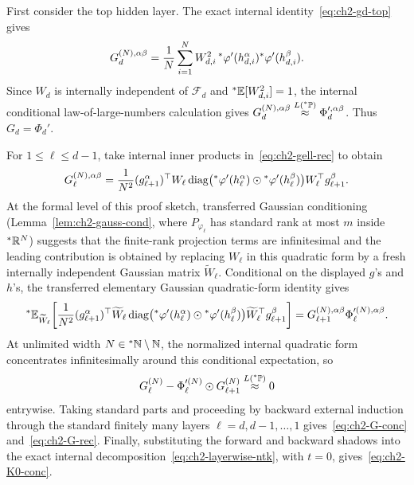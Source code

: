 \begin{proofsketch}
First consider the top hidden layer. The exact internal identity~\eqref{eq:ch2-gd-top} gives
\begin{equation}\label{eq:ch2-Gd-sum}
G_d^{(N),\alpha\beta} = \frac{1}{N} \sum_{i=1}^{N} W_{d,i}^2 \, {}^*\varphi'(h_{d,i}^\alpha){}^*\varphi'(h_{d,i}^\beta).
\end{equation}
Since $W_d$ is internally independent of $\mathcal{F}_d$ and ${}^*\mathbb{E}[W_{d,i}^2] = 1$, the internal conditional law-of-large-numbers calculation gives $G_d^{(N),\alpha\beta} \stackrel{L({}^*\mathbb{P})}{\approx} \Phi_d^{\prime,\alpha\beta}$. Thus $G_d = \Phi_d'$.

For $1 \le \ell \le d-1$, take internal inner products in~\eqref{eq:ch2-gell-rec} to obtain
\begin{equation}\label{eq:ch2-Gell-quad}
G_\ell^{(N),\alpha\beta} = \frac{1}{N^2} (g_{\ell+1}^\alpha)^\top W_\ell \operatorname{diag}\bigl({}^*\varphi'(h_\ell^\alpha) \odot {}^*\varphi'(h_\ell^\beta)\bigr) W_\ell^\top g_{\ell+1}^\beta.
\end{equation}
At the formal level of this proof sketch, transferred Gaussian conditioning (Lemma~\ref{lem:ch2-gauss-cond}, where $P_{\varphi_\ell}$ has standard rank at most $m$ inside ${}^*\mathbb{R}^N$) suggests that the finite-rank projection terms are infinitesimal and the leading contribution is obtained by replacing $W_\ell$ in this quadratic form by a fresh internally independent Gaussian matrix $\widetilde{W}_\ell$. Conditional on the displayed $g$'s and $h$'s, the transferred elementary Gaussian quadratic-form identity gives
\begin{equation}\label{eq:ch2-Gell-fresh-exp}
{}^*\mathbb{E}_{\widetilde{W}_\ell}\!\left[ \frac{1}{N^2} (g_{\ell+1}^\alpha)^\top \widetilde{W}_\ell \operatorname{diag}\bigl({}^*\varphi'(h_\ell^\alpha) \odot {}^*\varphi'(h_\ell^\beta)\bigr) \widetilde{W}_\ell^\top g_{\ell+1}^\beta \right]
= G_{\ell+1}^{(N),\alpha\beta} \Phi_\ell^{\prime(N),\alpha\beta}.
\end{equation}
At unlimited width $N \in {}^*\mathbb{N} \setminus \mathbb{N}$, the normalized internal quadratic form concentrates infinitesimally around this conditional expectation, so
\begin{equation}\label{eq:ch2-Gell-diff-inf}
G_\ell^{(N)} - \Phi_\ell^{\prime(N)} \odot G_{\ell+1}^{(N)} \stackrel{L({}^*\mathbb{P})}{\approx} 0
\end{equation}
entrywise. Taking standard parts and proceeding by backward external induction through the standard finitely many layers $\ell = d, d-1, \dots, 1$ gives~\eqref{eq:ch2-G-conc} and~\eqref{eq:ch2-G-rec}. Finally, substituting the forward and backward shadows into the exact internal decomposition~\eqref{eq:ch2-layerwise-ntk}, with $t = 0$, gives~\eqref{eq:ch2-K0-conc}.
\end{proofsketch}

